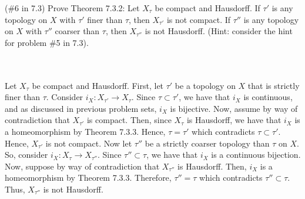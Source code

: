 (\#6 in 7.3) Prove Theorem 7.3.2: Let $X_{\tau}$ be compact and Hausdorff. If $\tau'$ is any
topology on $X$ with $\tau'$ finer than $\tau$, then $X_{\tau'}$ is not compact. If $\tau''$ is any
topology on $X$ with $\tau''$ coarser than $\tau$, then $X_{\tau''}$ is not Hausdorff.
(Hint: consider the hint for problem \#5 in 7.3).\\\\

\begin{solution}\renewcommand{\qedsymbol}{}\ \\
    Let $X_{\tau}$ be compact and Hausdorff. First, let $\tau'$ be a topology on $X$ that is strictly
    finer than $\tau$. Consider $i_X: X_{\tau'}\rightarrow X_{\tau}$. Since $\tau\subset\tau'$, we have
    that $i_X$ is continuous, and as discussed in previous problem sets, $i_X$ is bijective. Now, assume
    by way of contradiction that $X_{\tau'}$ is compact. Then, since $X_{\tau}$ is Hausdorff, we have
    that $i_X$ is a homeomorphism by Theorem 7.3.3. Hence, $\tau=\tau'$ which contradicts
    $\tau\subset\tau'$. Hence, $X_{\tau'}$ is not compact. Now let $\tau''$ be a strictly coarser
    topology than $\tau$ on $X$. So, consider $i_X:X_{\tau}\rightarrow X_{\tau''}$. Since
    $\tau''\subset\tau$, we have that $i_X$ is a continuous bijection. Now, suppose by way of
    contradiction that $X_{\tau''}$ is Hausdorff. Then, $i_X$ is a homeomorphism by Theorem 7.3.3.
    Therefore, $\tau''=\tau$ which contradicts $\tau''\subset\tau$. Thus, $X_{\tau''}$ is not Hausdorff.

\end{solution}